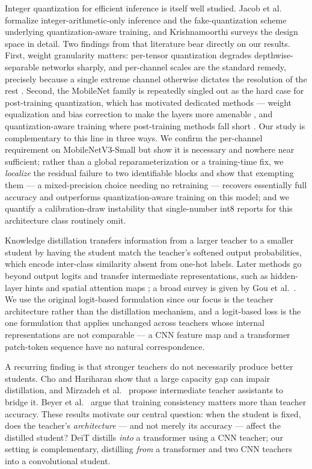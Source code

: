 \documentclass[conference]{IEEEtran}
\begin{document}
Integer quantization for efficient inference is itself well studied. Jacob et
al.\ \cite{jacob2018quantization} formalize integer-arithmetic-only inference and
the fake-quantization scheme underlying quantization-aware training, and
Krishnamoorthi \cite{krishnamoorthi2018quantizing} surveys the design space in
detail. Two findings from that literature bear directly on our results. First,
weight granularity matters: per-tensor quantization degrades depthwise-separable
networks sharply, and per-channel scales are the standard remedy, precisely
because a single extreme channel otherwise dictates the resolution of the rest
\cite{krishnamoorthi2018quantizing}. Second, the MobileNet family is repeatedly
singled out as the hard case for post-training quantization, which has motivated
dedicated methods --- weight equalization and bias correction to make the layers
more amenable \cite{nagel2019data}, and quantization-aware training where
post-training methods fall short \cite{nagel2021white}. Our study is
complementary to this line in three ways. We confirm the per-channel requirement
on MobileNetV3-Small but show it is necessary and nowhere near sufficient; rather
than a global reparameterization or a training-time fix, we \emph{localize} the
residual failure to two identifiable blocks and show that exempting them --- a
mixed-precision choice needing no retraining --- recovers essentially full
accuracy and outperforms quantization-aware training on this model; and we
quantify a calibration-draw instability that single-number int8 reports for this
architecture class routinely omit.

Knowledge distillation \cite{hinton2015distilling} transfers information from a
larger teacher to a smaller student by having the student match the teacher's
softened output probabilities, which encode inter-class similarity absent from
one-hot labels. Later methods go beyond output logits and transfer intermediate
representations, such as hidden-layer hints \cite{romero2015fitnets} and spatial
attention maps \cite{zagoruyko2017attention}; a broad survey is given by Gou et
al.\ \cite{gou2021knowledge}. We use the original logit-based formulation since
our focus is the teacher architecture rather than the distillation mechanism,
and a logit-based loss is the one formulation that applies unchanged across
teachers whose internal representations are not comparable --- a CNN feature map
and a transformer patch-token sequence have no natural correspondence.

A recurring finding is that stronger teachers do not necessarily produce better
students. Cho and Hariharan \cite{cho2019efficacy} show that a large capacity
gap can impair distillation, and Mirzadeh et al.\ \cite{mirzadeh2020improved}
propose intermediate teacher assistants to bridge it. Beyer et al.\
\cite{beyer2022knowledge} argue that training consistency matters more than
teacher accuracy. These results motivate our central question: when the student
is fixed, does the teacher's \emph{architecture} --- and not merely its
accuracy --- affect the distilled student? DeiT \cite{touvron2021training}
distills \emph{into} a transformer using a CNN teacher; our setting is
complementary, distilling \emph{from} a transformer and two CNN teachers into a
convolutional student.
\end{document}
